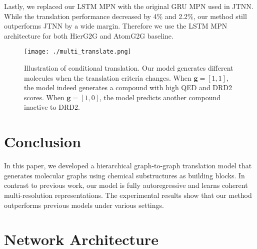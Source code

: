 \documentclass{article} \usepackage{iclr2020_conference,times}
\def\vg{{\bm{g}}}
\begin{document}
Lastly, we replaced our LSTM MPN with the original GRU MPN used in JTNN. While the translation performance decreased by 4\% and 2.2\%, our method still outperforms JTNN by a wide margin. Therefore we use the LSTM MPN architecture for both HierG2G and AtomG2G baseline. 

\begin{figure}[t]
    \centering
    \texttt{[image: ./multi\_translate.png]}
    \caption{Illustration of conditional translation. Our model generates different molecules when the translation criteria changes. When $\vg=[1,1]$, the model indeed generates a compound with high QED and DRD2 scores. When $\vg=[1,0]$, the model predicts another compound inactive to DRD2.}
    \label{fig:multi-translate}
    \vspace{-10pt}
\end{figure} \section{Conclusion}
In this paper, we developed a hierarchical graph-to-graph translation model that generates molecular graphs using chemical substructures as building blocks. In contrast to previous work, our model is fully autoregressive and learns coherent multi-resolution representations. The experimental results show that our method outperforms previous models under various settings. 



\newpage
\appendix
\section{Network Architecture}
\end{document}
